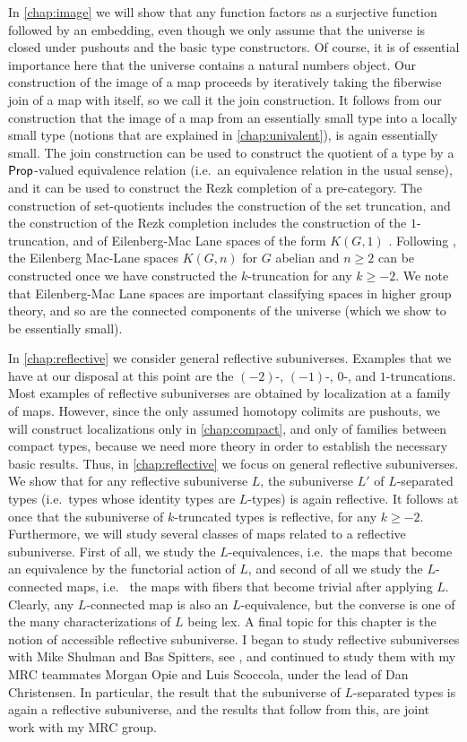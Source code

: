 In \cref{chap:image} we will show that any function factors as a surjective function followed by an embedding, even though we only assume that the universe is closed under pushouts and the basic type constructors. Of course, it is of essential importance here that the universe contains a natural numbers object. Our construction of the image of a map proceeds by iteratively taking the fiberwise join of a map with itself, so we call it the join construction. It follows from our construction that the image of a map from an essentially small type into a locally small type (notions that are explained in \cref{chap:univalent}), is again essentially small. The join construction can be used to construct the quotient of a type by a $\mathsf{Prop}$-valued equivalence relation (i.e.~an equivalence relation in the usual sense), and it can be used to construct the Rezk completion of a pre-category. The construction of set-quotients includes the construction of the set truncation, and the construction of the Rezk completion includes the construction of the $1$-truncation, and of Eilenberg-Mac Lane spaces of the form $K(G,1)$ \cite{FinsterLicata}. Following \cite{FinsterLicata}, the Eilenberg Mac-Lane spaces $K(G,n)$ for $G$ abelian and $n\geq 2$ can be constructed once we have constructed the $k$-truncation for any $k\geq -2$. We note that Eilenberg-Mac Lane spaces are important classifying spaces in higher group theory, and so are the connected components of the universe (which we show to be essentially small). 

In \cref{chap:reflective} we consider general reflective subuniverses. Examples that we have at our disposal at this point are the $(-2)$-, $(-1)$-, $0$-, and $1$-truncations. Most examples of reflective subuniverses are obtained by localization at a family of maps. However, since the only assumed homotopy colimits are pushouts, we will construct localizations only in \cref{chap:compact}, and only of families between compact types, because we need more theory in order to establish the necessary basic results. Thus, in \cref{chap:reflective} we focus on general reflective subuniverses. We show that for any reflective subuniverse $L$, the subuniverse $L'$ of $L$-separated types (i.e.~types whose identity types are $L$-types) is again reflective. It follows at once that the subuniverse of $k$-truncated types is reflective, for any $k\geq -2$. Furthermore, we will study several classes of maps related to a reflective subuniverse. First of all, we study the $L$-equivalences, i.e.~the maps that become an equivalence by the functorial action of $L$, and second of all we study the $L$-connected maps, i.e.~ the maps with fibers that become trivial after applying $L$. Clearly, any $L$-connected map is also an $L$-equivalence, but the converse is one of the many characterizations of $L$ being lex. A final topic for this chapter is the notion of accessible reflective subuniverse. I began to study reflective subuniverses with Mike Shulman and Bas Spitters, see \cite{RijkeShulmanSpitters}, and continued to study them with my MRC teammates Morgan Opie and Luis Scoccola, under the lead of Dan Christensen. In particular, the result that the subuniverse of $L$-separated types is again a reflective subuniverse, and the results that follow from this, are joint work with my MRC group. 


